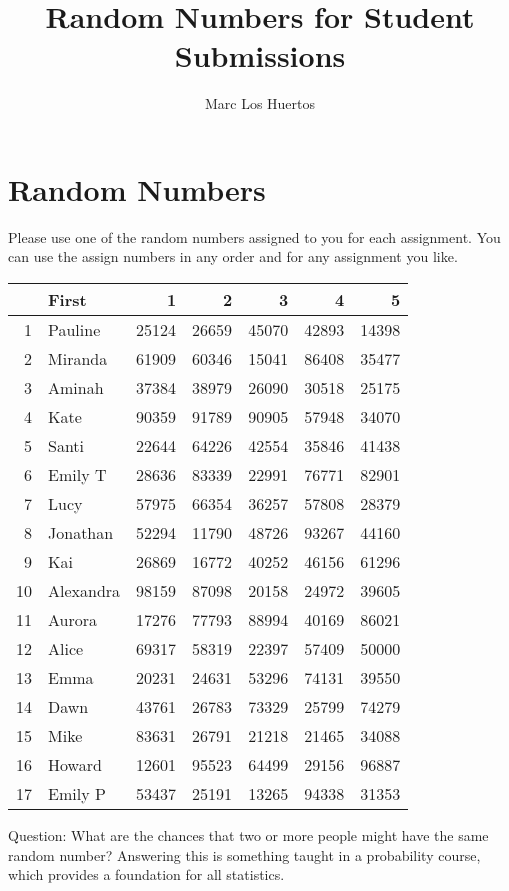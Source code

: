 \documentclass{article}\usepackage[]{graphicx}\usepackage[]{color}
\title{Random Numbers for Student Submissions}
\author{Marc Los Huertos}
\begin{document}
\maketitle


\section*{Random Numbers}

Please use one of the random numbers assigned to you for each assignment. You can use the assign numbers in any order and for any assignment you like. 

\begin{table}[ht]
\centering
\begin{tabular}{rlrrrrr}
  \hline
 & First & 1 & 2 & 3 & 4 & 5 \\ 
  \hline
1 & Pauline & 25124 & 26659 & 45070 & 42893 & 14398 \\ 
  2 & Miranda & 61909 & 60346 & 15041 & 86408 & 35477 \\ 
  3 & Aminah & 37384 & 38979 & 26090 & 30518 & 25175 \\ 
  4 & Kate & 90359 & 91789 & 90905 & 57948 & 34070 \\ 
  5 & Santi & 22644 & 64226 & 42554 & 35846 & 41438 \\ 
  6 & Emily T & 28636 & 83339 & 22991 & 76771 & 82901 \\ 
  7 & Lucy & 57975 & 66354 & 36257 & 57808 & 28379 \\ 
  8 & Jonathan & 52294 & 11790 & 48726 & 93267 & 44160 \\ 
  9 & Kai & 26869 & 16772 & 40252 & 46156 & 61296 \\ 
  10 & Alexandra & 98159 & 87098 & 20158 & 24972 & 39605 \\ 
  11 & Aurora & 17276 & 77793 & 88994 & 40169 & 86021 \\ 
  12 & Alice & 69317 & 58319 & 22397 & 57409 & 50000 \\ 
  13 & Emma & 20231 & 24631 & 53296 & 74131 & 39550 \\ 
  14 & Dawn & 43761 & 26783 & 73329 & 25799 & 74279 \\ 
  15 & Mike & 83631 & 26791 & 21218 & 21465 & 34088 \\ 
  16 & Howard & 12601 & 95523 & 64499 & 29156 & 96887 \\ 
  17 & Emily P & 53437 & 25191 & 13265 & 94338 & 31353 \\ 
   \hline
\end{tabular}
\end{table}


Question: What are the chances that two or more people might have the same random number?  Answering this is something taught in a probability course, which provides a foundation for all statistics.
\end{document}

